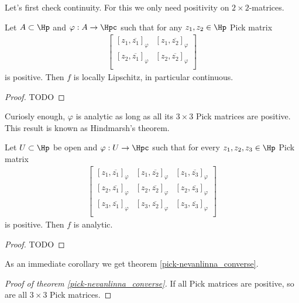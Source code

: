 Let's first check continuity. For this we only need positivity on $2 \times 2$-matrices.

\begin{lause}\label{pick_continuity_lemma}
	Let $A \subset \Hp$ and $\varphi : A \to \Hpc$ such that for any $z_{1}, z_{2} \in \Hp$ Pick matrix
	\begin{align*}
	\begin{bmatrix}
		[z_{1}, \overline{z_{1}}]_{\varphi} & [z_{1}, \overline{z_{2}}]_{\varphi}\\
		[z_{2}, \overline{z_{1}}]_{\varphi} & [z_{2}, \overline{z_{2}}]_{\varphi}\\
	\end{bmatrix}
	\end{align*}
	is positive. Then $f$ is locally Lipschitz, in particular continuous.
\end{lause}
\begin{proof}
	TODO
\end{proof}

Curiosly enough, $\varphi$ is analytic as long as all its $3 \times 3$ Pick matrices are positive. This result is known as Hindmarsh's theorem.

\begin{lause}\label{Hindmarsh_theorem}
	Let $U \subset \Hp$ be open and $\varphi : U \to \Hpc$ such that for every $z_{1}, z_{2}, z_{3} \in \Hp$ Pick matrix
	\begin{align*}
	\begin{bmatrix}
		[z_{1}, \overline{z_{1}}]_{\varphi} & [z_{1}, \overline{z_{2}}]_{\varphi} & [z_{1}, \overline{z_{3}}]_{\varphi}\\
		[z_{2}, \overline{z_{1}}]_{\varphi} & [z_{2}, \overline{z_{2}}]_{\varphi} & [z_{2}, \overline{z_{3}}]_{\varphi}\\
		[z_{3}, \overline{z_{1}}]_{\varphi} & [z_{3}, \overline{z_{2}}]_{\varphi} & [z_{3}, \overline{z_{3}}]_{\varphi}\\
	\end{bmatrix}
	\end{align*}
	is positive. Then $f$ is analytic.
\end{lause}
\begin{proof}
	TODO
\end{proof}

As an immediate corollary we get theorem \ref{pick-nevanlinna_converse}.

\begin{proof}[Proof of theorem \ref{pick-nevanlinna_converse}]
If all Pick matrices are positive, so are all $3 \times 3$ Pick matrices.
\end{proof}

